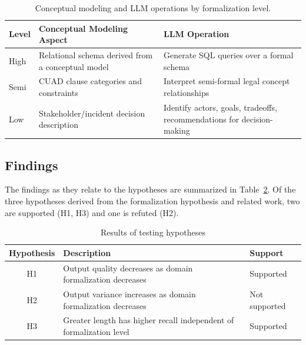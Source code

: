 \documentclass[runningheads]{llncs}
\begin{document}
\begin{table}[t]
\centering
\caption{Conceptual modeling and LLM operations by formalization level.}
\label{tab:cm-objects-operations}
\setlength{\tabcolsep}{6pt}
\begin{tabular}{l
    >{\RaggedRight\arraybackslash}p{4.6cm}
    >{\RaggedRight\arraybackslash}p{5.2cm}
}
\hline
Level & Conceptual Modeling Aspect & LLM Operation \\
\hline
High & Relational schema derived from a conceptual model 
     & Generate SQL queries over a formal schema \\
\addlinespace[2pt]
Semi & CUAD clause categories and constraints 
     & Interpret semi-formal legal concept relationships \\
\addlinespace[2pt]
Low  & Stakeholder/incident decision description 
     & Identify actors, goals, tradeoffs, recommendations for decision-making \\
\hline
\end{tabular}
\end{table}

\subsection{Findings}

The findings as they relate to the hypotheses are summarized in Table~\ref{tab:hyp}. Of the three hypotheses derived from the formalization hypothesis and related work, two are supported (H1, H3) and one is refuted (H2).

\begin{table}[htbp]
\centering
\caption{Results of testing hypotheses}
\label{tab:hyp}
\setlength{\tabcolsep}{6pt}
\begin{tabular}{c>{\RaggedRight\arraybackslash}p{5.6cm}l}
\toprule
Hypothesis & Description & Support  \\
\midrule
H1 & Output quality decreases as domain formalization decreases & Supported \\
\addlinespace[2pt]
H2 & Output variance increases as domain formalization decreases & Not supported \\
\addlinespace[2pt]
H3 & Greater length has higher recall independent of formalization level & Supported  \\
\bottomrule
\end{tabular}
\end{table}
\end{document}
